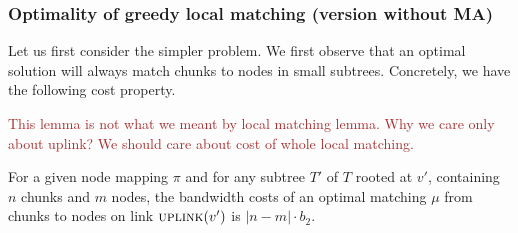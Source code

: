 \documentclass[9pt,twocolumn]{scrartcl}
\newcommand{\maciek}[1]{\textcolor{brown}{#1}}
\newcommand{\VmChunkAssignment}{\mu}
\newcommand{\NodeMapping}{\pi}
\newcommand{\SubstrateNode}{\ensuremath{v}}
\newcommand{\Uplink}{\ensuremath{\textsc{uplink}}}
\newcommand{\Tree}{\ensuremath{T}}
\newcommand{\CostTrans}{\ensuremath{b_2}}
\begin{document}
\subsubsection{Optimality of greedy local matching (version without MA)}

Let us first consider the simpler problem.
We first observe that an optimal solution will always
match chunks to nodes in small subtrees. Concretely,
we have the following cost property.

\maciek{This lemma is not what we meant by local matching lemma. Why we care only about uplink? We should care about cost of whole local matching.}

\begin{lemma}
\label{lemma:local_matching}
For a given node mapping $\NodeMapping$ and for any subtree $\Tree'$
of $\Tree$ rooted at $\SubstrateNode'$, containing $n$ chunks and $m$
nodes, the bandwidth costs of an optimal matching $\VmChunkAssignment$ 
from chunks to nodes on link $\Uplink(\SubstrateNode')$ is $|n
- m| \cdot \CostTrans$.
\end{lemma}
\end{document}
